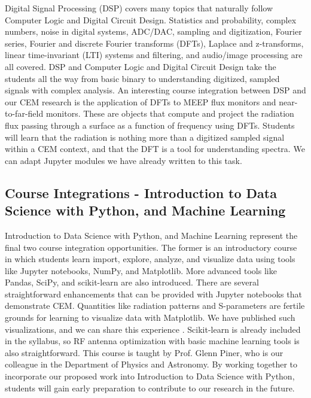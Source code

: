 \documentclass[../../main.tex]{subfiles}
\begin{document}
Digital Signal Processing (DSP) covers many topics that naturally follow Computer Logic and Digital Circuit Design.  Statistics and probability, complex numbers, noise in digital systems, ADC/DAC, sampling and digitization, Fourier series, Fourier and discrete Fourier transforms (DFTs), Laplace and z-transforms, linear time-invariant (LTI) systems and filtering, and audio/image processing are all covered.  DSP and Computer Logic and Digital Circuit Design take the students all the way from basic binary to understanding digitized, sampled signals with complex analysis.  An interesting course integration between DSP and our CEM research is the application of DFTs to MEEP flux monitors and near-to-far-field monitors.  These are objects that compute and project the radiation flux passing through a surface as a function of frequency using DFTs.  Students will learn that the radiation is nothing more than a digitized sampled signal within a CEM context, and that the DFT is a tool for understanding spectra.  We can adapt Jupyter modules we have already written to this task. \\ \vspace{2.5mm}

\subsection{Course Integrations - Introduction to Data Science with Python, and Machine Learning}

Introduction to Data Science with Python, and Machine Learning represent the final two course integration opportunities.  The former is an introductory course in which students learn import, explore, analyze, and visualize data using tools like Jupyter notebooks, NumPy, and Matplotlib.  More advanced tools like Pandas, SciPy, and scikit-learn are also introduced.  There are several straightforward enhancements that can be provided with Jupyter notebooks that demonstrate CEM.  Quantities like radiation patterns and S-parameters are fertile grounds for learning to visualize data with Matplotlib.  We have published such visualizations, and we can share this experience \cite{electronics10040415}.  Scikit-learn is already included in the syllabus, so RF antenna optimization with basic machine learning tools is also straightforward.  This course is taught by Prof. Glenn Piner, who is our colleague in the Department of Physics and Astronomy.  By working together to incorporate our proposed work into Introduction to Data Science with Python, students will gain early preparation to contribute to our research in the future.  \\ \vspace{2.5mm}
\end{document}
